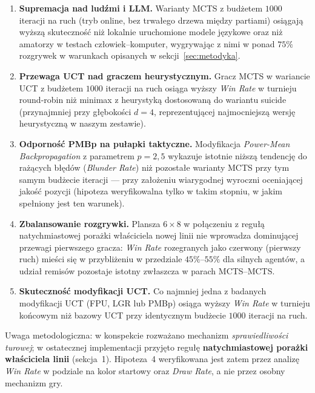 \documentclass[11pt, a4paper]{article}
\begin{document}
\begin{enumerate}
    \item \textbf{Supremacja nad ludźmi i LLM.}
    Warianty MCTS z budżetem $1000$ iteracji na ruch (tryb online, bez trwałego drzewa między partiami) osiągają wyższą skuteczność niż lokalnie uruchomione modele językowe oraz niż amatorzy w testach człowiek--komputer, wygrywając z nimi w ponad $75\%$ rozgrywek w warunkach opisanych w sekcji~\ref{sec:metodyka}.

    \item \textbf{Przewaga UCT nad graczem heurystycznym.}
    Gracz MCTS w wariancie UCT z budżetem $1000$ iteracji na ruch osiąga wyższy \textit{Win Rate} w turnieju round-robin niż minimax z heurystyką dostosowaną do wariantu suicide (przynajmniej przy głębokości $d=4$, reprezentującej najmocniejszą wersję heurystyczną w naszym zestawie).

    \item \textbf{Odporność PMBp na pułapki taktyczne.}
    Modyfikacja \textit{Power-Mean Backpropagation} z parametrem $p = 2{,}5$ wykazuje istotnie niższą tendencję do rażących błędów (\textit{Blunder Rate}) niż pozostałe warianty MCTS przy tym samym budżecie iteracji --- przy założeniu wiarygodnej wyroczni oceniającej jakość pozycji (hipoteza weryfikowalna tylko w takim stopniu, w jakim spełniony jest ten warunek).

    \item \textbf{Zbalansowanie rozgrywki.}
    Plansza $6 \times 8$ w połączeniu z regułą natychmiastowej porażki właściciela nowej linii nie wprowadza dominującej przewagi pierwszego gracza: \textit{Win Rate} rozegranych jako czerwony (pierwszy ruch) mieści się w przybliżeniu w przedziale $45\%$--$55\%$ dla silnych agentów, a udział remisów pozostaje istotny zwłaszcza w parach MCTS--MCTS.

    \item \textbf{Skuteczność modyfikacji UCT.}
    Co najmniej jedna z badanych modyfikacji UCT (FPU, LGR lub PMBp) osiąga wyższy \textit{Win Rate} w turnieju końcowym niż bazowy UCT przy identycznym budżecie $1000$ iteracji na ruch.
\end{enumerate}

\noindent
Uwaga metodologiczna: w konspekcie rozważano mechanizm \emph{sprawiedliwości turowej}; w ostatecznej implementacji przyjęto regułę \textbf{natychmiastowej porażki właściciela linii} (sekcja~1). Hipoteza~4 weryfikowana jest zatem przez analizę \textit{Win Rate} w podziale na kolor startowy oraz \textit{Draw Rate}, a nie przez osobny mechanizm gry.
\end{document}
